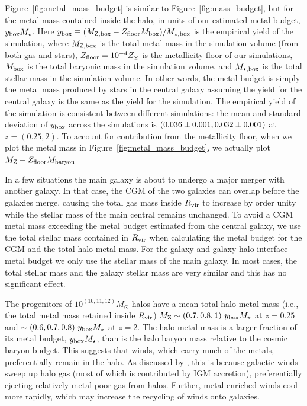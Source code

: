 \documentclass[fleqn,usenatbib]{mnras}
\begin{document}
Figure~\ref{fig:metal_mass_budget} is similar to Figure~\ref{fig:mass_budget}, but for the metal mass contained inside the halo, in units of our estimated metal budget, $y_{\rm box} M_\star$.
Here $y_{\rm box} \equiv (M_{\rm Z, box} - Z_{\rm floor} M_{\rm box} )/ M_{\star, \rm box}$ is the empirical yield of the simulation,
where $M_{\rm Z,box}$ is the total metal mass in the simulation volume (from both gas and stars),
$Z_{\rm floor} = 10^{-4}Z_\odot$ is the metallicity floor of our simulations,
$M_{\rm box}$ is the total baryonic mass in the simulation volume,
and $M_{\rm\star,box}$ is the total stellar mass in the simulation volume.
In other words, the metal budget is simply the metal mass produced by stars in the central galaxy assuming the yield for the central galaxy is the same as the yield for the simulation. 
The empirical yield of the simulation is consistent between different simulations:
the mean and standard deviation of $y_{\rm box}$ across the simulations is $(0.036\pm0.001,0.032\pm0.001) $ at $z=(0.25, 2)$.
To account for contribution from the metallicity floor, when we plot the metal mass in Figure~\ref{fig:metal_mass_budget}, we actually plot $M_{\rm Z} - Z_{\rm floor} M_{\rm baryon}$

In a few situations the main galaxy is about to undergo a major merger with another galaxy. 
In that case, the CGM of the two galaxies can overlap before the galaxies merge, causing the total gas mass inside $R_{\rm vir}$ to increase by order unity while the stellar mass of the main central remains unchanged. 
To avoid a CGM metal mass exceeding the metal budget estimated from the central galaxy, we use the total stellar mass contained in $R_{\rm vir}$ when calculating the metal budget for the CGM and the total halo metal mass.
For the galaxy and galaxy-halo interface metal budget we only use the stellar mass of the main galaxy.
In most cases, the total stellar mass and the galaxy stellar mass are very similar and this has no significant effect.

The progenitors of $10^{(10,11,12)} M_\odot$ halos have a mean total halo metal mass (i.e., the total metal mass retained inside $R_{\rm vir}$) $M_{\rm Z} \sim(0.7,0.8,1) ~ y_{\rm box} M_\star$ at $z=0.25$ and  $\sim(0.6,0.7,0.8) ~ y_{\rm box} M_\star$ at $z=2$. 
The halo metal mass is a larger fraction of its metal budget, $y_{\rm box} M_\star$, than is the halo baryon mass relative to the cosmic baryon budget. 
This suggests that winds, which carry much of the metals, preferentially remain in the halo. 
As discussed by \cite{Muratov2016}, this is because galactic winds sweep up halo gas (most of which is contributed by IGM accretion), preferentially ejecting relatively metal-poor gas from halos. 
Further, metal-enriched winds cool more rapidly, which may increase the recycling of winds onto galaxies. 
\end{document}
